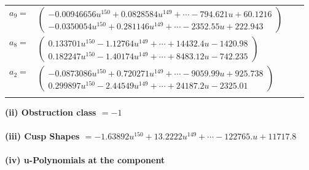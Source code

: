\documentclass[1p]{elsarticle_modified}
\theoremstyle{definition}
\begin{document}
\begin{tabular}{m{7pt} m{180pt} m{7pt} m{180pt} }
\flushright $a_{9}=$&$\begin{pmatrix}-0.00946656 u^{150}+0.0828584 u^{149}+\cdots-794.621 u+60.1216\\-0.0350054 u^{150}+0.281146 u^{149}+\cdots-2352.55 u+222.943\end{pmatrix}$ \\
\flushright $a_{8}=$&$\begin{pmatrix}0.133701 u^{150}-1.12764 u^{149}+\cdots+14432.4 u-1420.98\\0.182247 u^{150}-1.40174 u^{149}+\cdots+8483.12 u-742.235\end{pmatrix}$ \\
\flushright $a_{2}=$&$\begin{pmatrix}-0.0873086 u^{150}+0.720271 u^{149}+\cdots-9059.99 u+925.738\\0.299897 u^{150}-2.44549 u^{149}+\cdots+24187.2 u-2325.01\end{pmatrix}$\\&\end{tabular}
\flushleft \textbf{(ii) Obstruction class $= -1$}\\~\\
\flushleft \textbf{(iii) Cusp Shapes $= -1.63892 u^{150}+13.2222 u^{149}+\cdots-122765. u+11717.8$}\\~\\
\newpage\renewcommand{\arraystretch}{1}
\flushleft \textbf{(iv) u-Polynomials at the component}\newline \\
\end{document}
